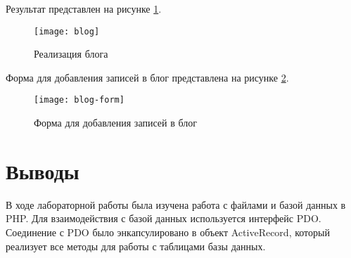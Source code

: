 \documentclass[a4paper,14pt]{extarticle}
\begin{document}
Результат представлен на рисунке \ref{fig:blog}.
\begin{figure}[H]
    \centering
    \texttt{[image: blog]}
    \caption{Реализация блога}
    \label{fig:blog}
\end{figure}

Форма для добавления записей в блог представлена на рисунке \ref{fig:blog-form}.
\begin{figure}[H]
    \centering
    \texttt{[image: blog-form]}
    \caption{Форма для добавления записей в блог}
    \label{fig:blog-form}
\end{figure}

\section*{Выводы}
В ходе лабораторной работы была изучена работа с файлами и базой данных в PHP.
Для взаимодействия с базой данных используется интерфейс PDO. Соединение с PDO
было энкапсулировано в объект ActiveRecord, который реализует все методы для
работы с таблицами базы данных.
\end{document}
